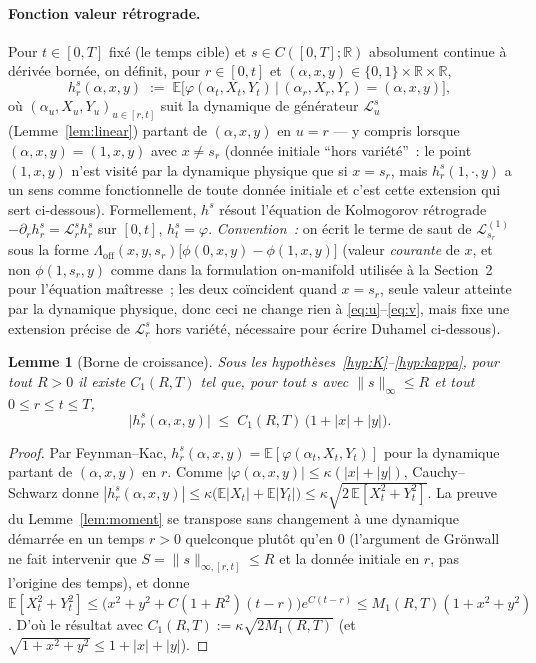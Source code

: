 \documentclass[11pt,a4paper]{article}
\newcommand{\E}{\mathbb{E}}
\newcommand{\R}{\mathbb{R}}
\newcommand{\Loff}{\Lambda_{\mathrm{off}}}
\theoremstyle{plain}
\newtheorem{lem}[thm]{Lemme}
\theoremstyle{definition}
\begin{document}
\paragraph{Fonction valeur r\'etrograde.} Pour $t\in[0,T]$ fix\'e (le temps cible) et $s\in C([0,T];\R)$ absolument continue \`a d\'eriv\'ee born\'ee, on d\'efinit, pour $r\in[0,t]$ et $(\alpha,x,y)\in\{0,1\}\times\R\times\R$,
\[
h^s_r(\alpha,x,y) \;:=\; \E\big[\varphi(\alpha_t,X_t,Y_t) \,\big|\, (\alpha_r,X_r,Y_r)=(\alpha,x,y)\big],
\]
o\`u $(\alpha_u,X_u,Y_u)_{u\in[r,t]}$ suit la dynamique de g\'en\'erateur $\mathcal L^s_u$ (Lemme~\ref{lem:linear}) partant de $(\alpha,x,y)$ en $u=r$ — y compris lorsque $(\alpha,x,y)=(1,x,y)$ avec $x\ne s_r$ (donn\'ee initiale ``hors vari\'et\'e''~: le point $(1,x,y)$ n'est visit\'e par la dynamique physique que si $x=s_r$, mais $h^s_r(1,\cdot,y)$ a un sens comme fonctionnelle de toute donn\'ee initiale et c'est cette extension qui sert ci-dessous). Formellement, $h^s$ r\'esout l'\'equation de Kolmogorov r\'etrograde $-\partial_rh^s_r=\mathcal L^s_rh^s_r$ sur $[0,t]$, $h^s_t=\varphi$. \emph{Convention~:} on \'ecrit le terme de saut de $\mathcal L^{(1)}_{s_r}$ sous la forme $\Loff(x,y,s_r)\big[\phi(0,x,y)-\phi(1,x,y)\big]$ (valeur \emph{courante} de $x$, et non $\phi(1,s_r,y)$ comme dans la formulation on-manifold utilis\'ee \`a la Section~2 pour l'\'equation ma\^itresse~; les deux co\"incident quand $x=s_r$, seule valeur atteinte par la dynamique physique, donc ceci ne change rien \`a \eqref{eq:u}--\eqref{eq:v}, mais fixe une extension pr\'ecise de $\mathcal L^s_r$ hors vari\'et\'e, n\'ecessaire pour \'ecrire Duhamel ci-dessous).

\begin{lem}[Borne de croissance]
\label{lem:hgrowth}
Sous les hypoth\`eses~\ref{hyp:K}--\ref{hyp:kappa}, pour tout $R>0$ il existe $C_1(R,T)$ tel que, pour tout $s$ avec $\|s\|_\infty\le R$ et tout $0\le r\le t\le T$,
\[
\big|h^s_r(\alpha,x,y)\big| \;\le\; C_1(R,T)\,\big(1+|x|+|y|\big).
\]
\end{lem}
\begin{proof}
Par Feynman--Kac, $h^s_r(\alpha,x,y)=\E[\varphi(\alpha_t,X_t,Y_t)]$ pour la dynamique partant de $(\alpha,x,y)$ en $r$. Comme $|\varphi(\alpha,x,y)|\le\kappa(|x|+|y|)$, Cauchy--Schwarz donne $|h^s_r(\alpha,x,y)|\le\kappa\big(\E|X_t|+\E|Y_t|\big)\le\kappa\sqrt{2\,\E[X_t^2+Y_t^2]}$. La preuve du Lemme~\ref{lem:moment} se transpose sans changement \`a une dynamique d\'emarr\'ee en un temps $r>0$ quelconque plut\^ot qu'en $0$ (l'argument de Gr\"onwall ne fait intervenir que $S=\|s\|_{\infty,[r,t]}\le R$ et la donn\'ee initiale en $r$, pas l'origine des temps), et donne $\E[X_t^2+Y_t^2]\le\big(x^2+y^2+C(1+R^2)(t-r)\big)e^{C(t-r)}\le M_1(R,T)(1+x^2+y^2)$. D'o\`u le r\'esultat avec $C_1(R,T):=\kappa\sqrt{2M_1(R,T)}$ (et $\sqrt{1+x^2+y^2}\le1+|x|+|y|$).
\end{proof}
\end{document}
